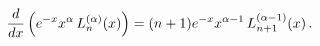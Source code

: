 \[\frac{d}{dx}\left(e^{-x}x^{\alpha}\mathop{L^{(\alpha)}_{n}\/}\nolimits\!\left(%
x\right)\right)=(n+1)e^{-x}x^{\alpha-1}\mathop{L^{(\alpha-1)}_{n+1}\/}%
\nolimits\!\left(x\right).\]